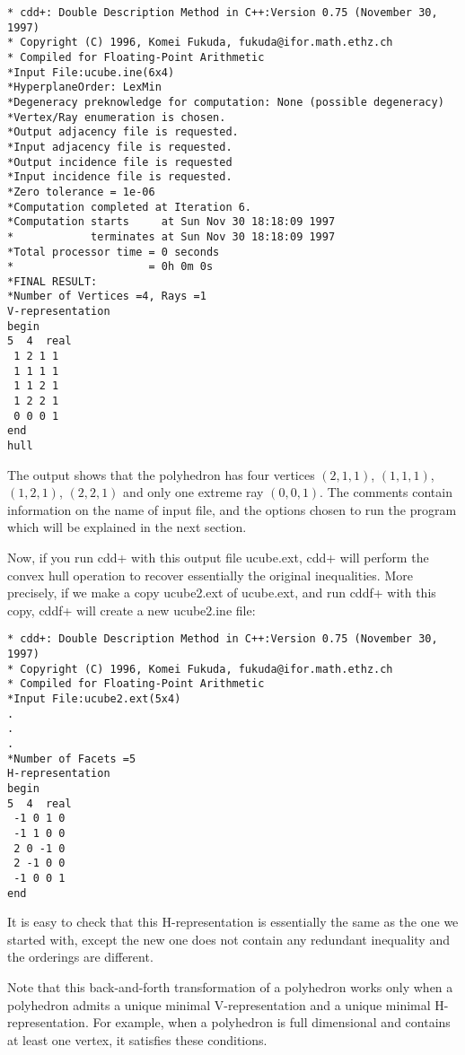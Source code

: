 \documentclass[11pt]{article}
\begin{document}
\begin{verbatim}
* cdd+: Double Description Method in C++:Version 0.75 (November 30, 1997)
* Copyright (C) 1996, Komei Fukuda, fukuda@ifor.math.ethz.ch
* Compiled for Floating-Point Arithmetic
*Input File:ucube.ine(6x4)
*HyperplaneOrder: LexMin
*Degeneracy preknowledge for computation: None (possible degeneracy)
*Vertex/Ray enumeration is chosen.
*Output adjacency file is requested.
*Input adjacency file is requested.
*Output incidence file is requested
*Input incidence file is requested.
*Zero tolerance = 1e-06
*Computation completed at Iteration 6.
*Computation starts     at Sun Nov 30 18:18:09 1997
*            terminates at Sun Nov 30 18:18:09 1997
*Total processor time = 0 seconds
*                     = 0h 0m 0s
*FINAL RESULT:
*Number of Vertices =4, Rays =1
V-representation
begin
5  4  real
 1 2 1 1
 1 1 1 1
 1 1 2 1
 1 2 2 1
 0 0 0 1
end
hull
\end{verbatim}

The output shows that the polyhedron has four vertices
$(2,1,1)$, $(1,1,1)$, $(1,2,1)$, $(2,2,1)$ and
only one extreme ray $(0,0,1)$.  The comments contain
information on the name of input file, and the options
chosen to run the program which will be explained in
the next section.  

Now, if you run cdd+ with this output file ucube.ext,
cdd+ will perform the convex hull operation to recover 
essentially the original inequalities.  More precisely, if
we make a copy ucube2.ext of ucube.ext, and run
cddf+ with this copy, cddf+ will create a new ucube2.ine file:

\begin{verbatim}
* cdd+: Double Description Method in C++:Version 0.75 (November 30, 1997)
* Copyright (C) 1996, Komei Fukuda, fukuda@ifor.math.ethz.ch
* Compiled for Floating-Point Arithmetic
*Input File:ucube2.ext(5x4)
.
.
.
*Number of Facets =5
H-representation
begin
5  4  real
 -1 0 1 0
 -1 1 0 0
 2 0 -1 0
 2 -1 0 0
 -1 0 0 1
end
\end{verbatim}

It is easy to check that this H-representation is
essentially the same as the one we started with, except the
new one does not contain any redundant inequality and the orderings
are different.

Note that this back-and-forth transformation of a polyhedron works
only when a polyhedron admits a unique minimal V-representation
and a unique minimal H-representation.
For example, when a polyhedron is full dimensional and contains
at least one vertex, it satisfies these conditions.
\end{document}
